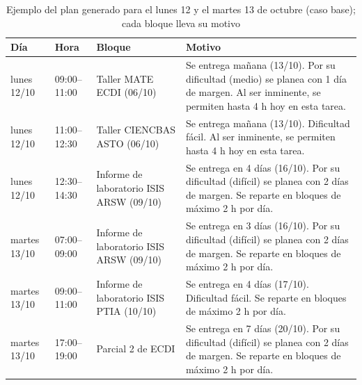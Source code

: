 \begin{table}[H]
\centering\footnotesize
\caption{Ejemplo del plan generado para el lunes 12 y el martes 13 de octubre (caso base); cada bloque lleva su motivo}\label{tab:ejemplo}
\begin{tabularx}{\textwidth}{l l >{\raggedright\arraybackslash}p{4.6cm} >{\raggedright\arraybackslash}X}
\toprule
Día & Hora & Bloque & Motivo \\
\midrule
lunes 12/10 & 09:00--11:00 & Taller MATE ECDI (06/10) & Se entrega mañana (13/10). Por su dificultad (medio) se planea con 1 día de margen. Al ser inminente, se permiten hasta 4 h hoy en esta tarea. \\
lunes 12/10 & 11:00--12:30 & Taller CIENCBAS ASTO (06/10) & Se entrega mañana (13/10). Dificultad fácil. Al ser inminente, se permiten hasta 4 h hoy en esta tarea. \\
lunes 12/10 & 12:30--14:30 & Informe de laboratorio ISIS ARSW (09/10) & Se entrega en 4 días (16/10). Por su dificultad (difícil) se planea con 2 días de margen. Se reparte en bloques de máximo 2 h por día. \\
martes 13/10 & 07:00--09:00 & Informe de laboratorio ISIS ARSW (09/10) & Se entrega en 3 días (16/10). Por su dificultad (difícil) se planea con 2 días de margen. Se reparte en bloques de máximo 2 h por día. \\
martes 13/10 & 09:00--11:00 & Informe de laboratorio ISIS PTIA (10/10) & Se entrega en 4 días (17/10). Dificultad fácil. Se reparte en bloques de máximo 2 h por día. \\
martes 13/10 & 17:00--19:00 & Parcial 2 de ECDI & Se entrega en 7 días (20/10). Por su dificultad (difícil) se planea con 2 días de margen. Se reparte en bloques de máximo 2 h por día. \\
\bottomrule
\end{tabularx}
\end{table}
